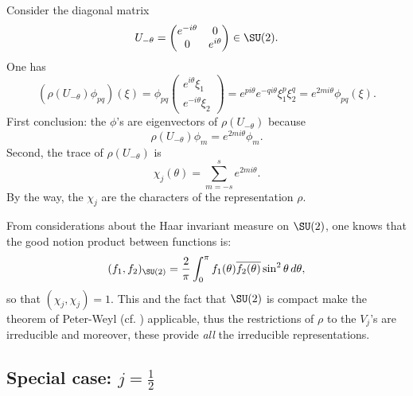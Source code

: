 Consider the diagonal matrix
\[   U_{-\theta}=\begin{pmatrix}
e^{-i\theta} & 0 \\
0 & e^{i\theta}
\end{pmatrix} \in\SU(2).
\]
One has
\begin{equation}
  \left(\rho(U_{-\theta})\phi_{pq}\right)(\xi)=\phi_{pq}
\begin{pmatrix}
   e^{i\theta}\xi_1 \\
    e^{-i\theta}\xi_2
\end{pmatrix}
                                               = e^{pi\theta} e^{-qi\theta}\xi_1^p\xi_2^q
					       =e^{2mi\theta}\phi_{pq}(\xi).
\end{equation}
First conclusion: the $\phi$'s are eigenvectors of $\rho(U_{-\theta})$ because
\[
   \rho(U_{-\theta})\phi_m=e^{2mi\theta}\phi_m.
\]
Second, the trace of $\rho(U_{-\theta})$ is
\begin{equation}
   \chi_j(\theta)=\sum_{m=-s}^{s}e^{2mi\theta}.
\end{equation}
By the way, the $\chi_j$ are the characters of the representation $\rho$.

From considerations about the Haar\quextproj{} invariant measure on $\SU(2)$, one knows that the good notion product between functions is:
\begin{equation}
(f_1,f_2)_{\SU(2)}=\frac{2}{\pi}\int_0^{\pi}f_1(\theta)\overline{ f_2(\theta) }\sin^2\theta\,d\theta,
\end{equation}
so that $(\chi_j,\chi_j)=1$. This and the fact that $\SU(2)$ is compact make the theorem of Peter-Weyl (cf. \cite{Sternberg}) applicable, thus the restrictions of $\rho$ to the $V_j$'s are irreducible and moreover, these provide \emph{all} the irreducible representations.

\subsection{Special case: \texorpdfstring{$j=\frac{1}{2}$}{j=1/2}}

